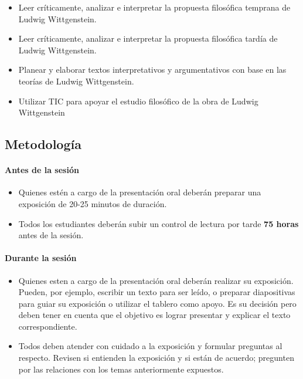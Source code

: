 \documentclass[spanish,]{article}
\let\oldparagraph\paragraph
\renewcommand{\paragraph}[1]{\oldparagraph{#1}\mbox{}}
\begin{document}
\begin{itemize}
\item
  Leer críticamente, analizar e interpretar la propuesta filosófica
  temprana de Ludwig Wittgenstein.
\item
  Leer críticamente, analizar e interpretar la propuesta filosófica
  tardía de Ludwig Wittgenstein.
\item
  Planear y elaborar textos interpretativos y argumentativos con base en
  las teorías de Ludwig Wittgenstein.
\item
  Utilizar TIC para apoyar el estudio filosófico de la obra de Ludwig
  Wittgenstein
\end{itemize}

\subsection{Metodología}\label{metodologia}

\paragraph{\texorpdfstring{\textbf{Antes de la
sesión}}{Antes de la sesión}}\label{antes-de-la-sesion}

\begin{itemize}
\item
  Quienes estén a cargo de la presentación oral deberán preparar una
  exposición de 20-25 minutos de duración.
\item
  Todos los estudiantes deberán subir un control de lectura por tarde
  \textbf{75 horas} antes de la sesión.
\end{itemize}

\paragraph{\texorpdfstring{\textbf{Durante la
sesión}}{Durante la sesión}}\label{durante-la-sesion}

\begin{itemize}
\item
  Quienes esten a cargo de la presentación oral deberán realizar su
  exposición. Pueden, por ejemplo, escribir un texto para ser leído, o
  preparar diapositivas para guiar su exposición o utilizar el tablero
  como apoyo. Es su decisión pero deben tener en cuenta que el objetivo
  es lograr presentar y explicar el texto correspondiente.
\item
  Todos deben atender con cuidado a la exposición y formular preguntas
  al respecto. Revisen si entienden la exposición y si están de acuerdo;
  pregunten por las relaciones con los temas anteriormente expuestos.
\end{itemize}
\end{document}

